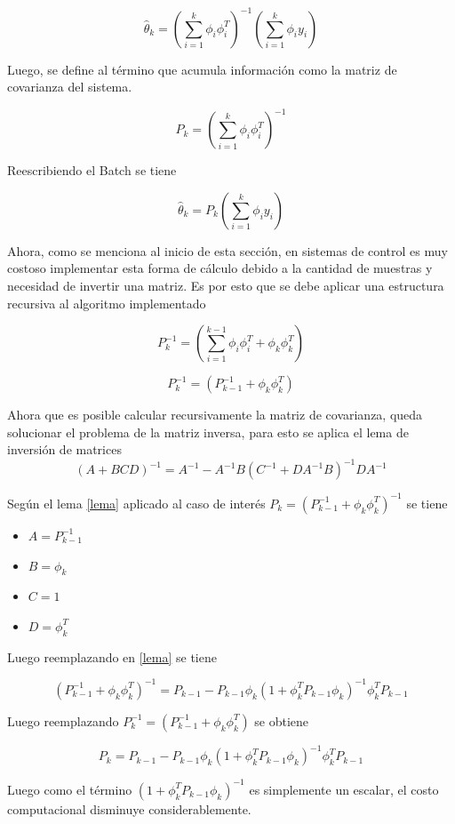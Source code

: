 \[
  \hat{\theta}_k = (\sum_{i=1}^{k} \phi_i\phi^T_i)^{-1} (\sum_{i=1}^{k} \phi_i y_i) 
\]

Luego, se define al término que acumula información como la matriz de covarianza del sistema.

\[
  P_k = (\sum_{i=1}^{k} \phi_i\phi^T_i)^{-1}
\]

Reescribiendo el Batch se tiene

\[
  \hat{\theta}_k = P_k (\sum_{i=1}^{k} \phi_i y_i) 
\]

Ahora, como se menciona al inicio de esta sección, en sistemas de control es muy costoso implementar esta forma de cálculo debido a la cantidad de muestras y necesidad de invertir una matriz. Es por esto que se debe aplicar una estructura recursiva al algoritmo implementado


\[
  P_k^{-1} = (\sum_{i=1}^{k-1} \phi_i\phi^T_i + \phi_k\phi_k^T)
\]

\[
  P_k^{-1} = (P_{k-1}^{-1} + \phi_k\phi_k^T)
\]

Ahora que es posible calcular recursivamente la matriz de covarianza, queda solucionar el problema de la matriz inversa, para esto se aplica el lema de inversión de matrices \cite{astrom1995adaptive}        
\begin{equation}
  (A + BCD)^{-1} = A^{-1} - A^{-1}B(C^{-1} + DA^{-1}B)^{-1}DA^{-1}
  \label{lema}
\end{equation}

Según el lema \ref{lema} aplicado al caso de interés $P_k = (P_{k-1}^{-1} + \phi_k \phi_k^T)^{-1} $ se tiene
\begin{itemize}
  \item $A = P_{k-1}^{-1}$
  \item $B = \phi_k$
  \item $C = 1$
  \item $D = \phi_k^T$
\end{itemize}

Luego reemplazando en \ref{lema} se tiene

\[
  (P_{k-1}^{-1} + \phi_k\phi_k^T)^{-1} = P_{k-1} - P_{k-1}\phi_k(1 +  \phi_k^TP_{k-1}\phi_k)^{-1}\phi_k^TP_{k-1}
\]

Luego reemplazando $P_k^{-1} = (P_{k-1}^{-1} + \phi_k\phi_k^T)$ se obtiene

\[
  P_k = P_{k-1} - P_{k-1}\phi_k(1 +  \phi_k^TP_{k-1}\phi_k)^{-1}\phi_k^TP_{k-1}
\]

Luego como el término $(1 +  \phi_k^TP_{k-1}\phi_k)^{-1}$ es simplemente un escalar, el costo computacional disminuye considerablemente.

